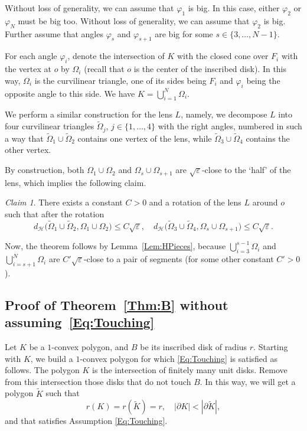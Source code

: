 \documentclass[11pt, oneside]{amsart}
\newcommand{\dH}{d_{\mathcal H}}
\renewcommand{\tilde}{\widetilde}
\renewcommand{\phi}{\varphi}
\newcommand{\eps}{\varepsilon}
\renewcommand{\le}{\leqslant}
\theoremstyle{theorem}
\theoremstyle{Intro}
\theoremstyle{definition}
\theoremstyle{remark}
\theoremstyle{claim}
\newtheorem{claim}[theorem]{Claim}
\numberwithin{equation}{section}
\begin{document}
Without loss of generality, we can assume that $\phi_1$ is big. In this case, either $\phi_2$ or $\phi_N$ must be big too. Without loss of generality, we can assume that $\phi_2$ is big. Further assume that angles $\phi_s$ and $\phi_{s+1}$ are big for some $s \in \{3, \ldots, N-1\}$.

For each angle $\phi_i$, denote the intersection of $K$ with the closed cone over $F_i$ with the vertex at $o$ by $\Omega_i$ (recall that $o$ is the center of the inscribed disk). In this way, $\Omega_i$ is the curvilinear triangle, one of its sides being $F_i$ and $\phi_i$ being the opposite angle to this side. We have $K = \displaystyle\bigcup_{i=1}^N \Omega_i$.

We perform a similar construction for the lens $L$, namely, we decompose $L$ into four curvilinear triangles $\tilde \Omega_j$, $j \in \{1,\ldots, 4\}$ with the right angles,  numbered in such a way that $\tilde \Omega_1 \cup \tilde \Omega_2$ contains one vertex of the lens, while $\tilde \Omega_3 \cup \tilde \Omega_4$ contains the other vertex. 

By construction, both $\Omega_1 \cup \Omega_2$ and $\Omega_s \cup \Omega_{s+1}$ are $\sqrt{\eps}$-close to the `half' of the lens, which implies the following claim.

\begin{claim}
There exists a constant $C > 0$ and a rotation of the lens $L$ around $o$ such that after the rotation
\[
\dH\big(\tilde \Omega_1 \cup \tilde \Omega_2, \Omega_1 \cup \Omega_2\big) \le C \sqrt{\eps}, \quad \dH\big(\tilde \Omega_3 \cup \tilde \Omega_4, \Omega_s \cup \Omega_{s+1}\big) \le C \sqrt{\eps}.
\] 
\end{claim}




Now, the theorem follows by Lemma~\ref{Lem:HPieces}, because $\displaystyle\bigcup_{i =3}^{s-1} \Omega_i$ and $\displaystyle\bigcup_{i =s+1}^{N} \Omega_i$ are $C'\sqrt{\eps}$-close to a pair of segments (for some other constant $C'>0$).


\subsection{Proof of Theorem~\ref{Thm:B} without assuming~\eqref{Eq:Touching}}

Let $K$ be a $1$-convex polygon, and $B$ be its inscribed disk of radius $r$. Starting with $K$, we build a $1$-convex polygon for which \eqref{Eq:Touching} is satisfied as follows. The polygon $K$ is the intersection of finitely many unit disks. Remove from this intersection those disks that do not touch $B$. In this way, we will get a polygon $\tilde K$ such that
\begin{equation}
\label{Eq:InitialConstruction}
r(K) = r(\tilde K) = r, \quad |\partial K| < |\partial \tilde K|,
\end{equation}
and that satisfies Assumption \eqref{Eq:Touching}.
\end{document}
